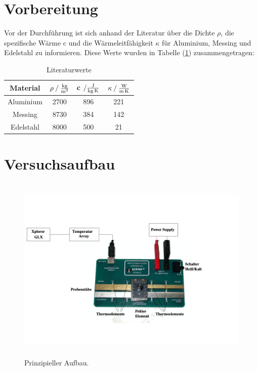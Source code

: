 \section{Vorbereitung}
Vor der Durchführung ist sich anhand der Literatur über die Dichte $\rho$, die spezifische Wärme c und die Wärmeleitfähigkeit $\kappa$ für Aluminium, Messing und Edelstahl zu informieren.
Diese Werte wurden  in Tabelle (\ref{tab:literaturwerte}) zusammengetragen:

\begin{table}
\centering
\begin{tabular}{c c c c}
\toprule
{Material} &{$ \rho \mathbin{/} \si[per-mode=fraction]{\kilo\gram\per\cubic\meter} $} & {c $ \mathbin{/} \si[per-mode=fraction]{\joule\per\kilo\gram\per\kelvin} $} & {$ \kappa \mathbin{/} \si[per-mode=fraction]{\watt\per\meter\per\kelvin} $} \\
\midrule
Aluminium & 2700 & 896 & 221 \\
Messing   & 8730 & 384 & 142 \\
Edelstahl & 8000 & 500 & 21  \\
\bottomrule
\end{tabular}
\caption{Literaturwerte}
\label{tab:literaturwerte}
\end{table}

\newpage
\section{Versuchsaufbau}

\begin{figure}
            \centering
               \includegraphics[height=9cm]{Daten/V204_aufbau.pdf}
               \caption{Prinzipieller Aufbau.}
               \label{fig:aufbauwaermeleitung}
        \end{figure}

